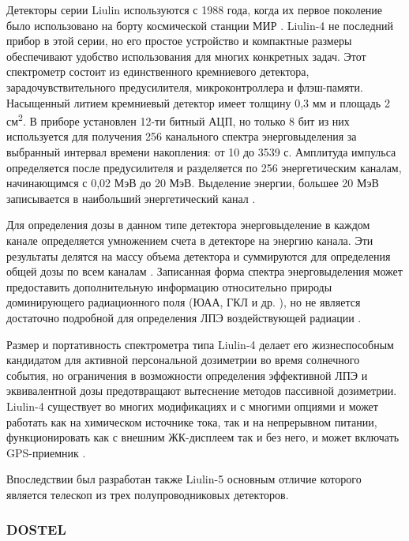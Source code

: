 Детекторы серии Liulin используются с 1988 года, когда их первое поколение было использовано на борту космической станции МИР \cite{Caffrey2011}. Liulin-4 не последний прибор в этой серии, но его простое устройство и компактные размеры обеспечивают удобство использования для многих конкретных задач. Этот спектрометр состоит из единственного кремниевого детектора, зарадочувствительного предусилителя, микроконтроллера и флэш-памяти. Насыщенный литием кремниевый детектор имеет толщину 0,3 мм и площадь 2 см\textsuperscript{2}. В приборе установлен 12-ти битный АЦП, но только 8 бит из них используется для получения 256 канального спектра энерговыделения за выбранный интервал времени накопления: от 10 до 3539 с. Амплитуда импульса определяется после предусилителя и разделяется по 256 энергетическим каналам, начинающимся с 0,02 МэВ до 20 МэВ. Выделение энергии, большее 20 МэВ записывается в наибольший энергетический канал \cite{Dachev2002} .


Для определения дозы в данном типе детектора энерговыделение в каждом канале определяется умножением счета в детекторе на энергию канала. Эти результаты делятся на массу объема детектора и суммируются для определения общей дозы по всем каналам \cite{Dachev2002}. Записанная форма спектра энерговыделения может предоставить дополнительную информацию относительно природы доминирующего радиационного поля (ЮАА, ГКЛ и др. ), но не является достаточно подробной для определения ЛПЭ воздействующей радиации \cite{Caffrey2011}. 


Размер и портативность спектрометра типа Liulin-4 делает его жизнеспособным кандидатом для активной персональной дозиметрии во время солнечного события, но ограничения в возможности определения эффективной ЛПЭ и эквивалентной дозы предотвращают вытеснение методов пассивной дозиметрии. Liulin-4 существует во многих модификациях и с многими опциями и может работать как на химическом источнике тока, так и на непрерывном питании, функционировать как с внешним ЖК-дисплеем так и без него, и может включать GPS-приемник \cite{Dachev2002}.	

Впоследствии был разработан также Liulin-5 основным отличие которого является телескоп из трех полупроводниковых детекторов.

\subsubsection{DOSTEL}


